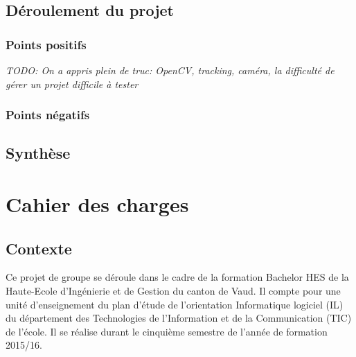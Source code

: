 \documentclass[11pt,a4paper,oldfontcommands]{memoir}
\begin{document}
\section{Déroulement du projet}

\subsection{Points positifs}

\textit{TODO: On a appris plein de truc: OpenCV, tracking, caméra, la difficulté de gérer un projet difficile à tester}

\subsection{Points négatifs}

\section{Synthèse}


\lstlistoflistings


\appendix


\chapter{Cahier des charges}

\section{Contexte}

Ce projet de groupe se déroule dans le cadre de la formation Bachelor HES de la Haute-Ecole d'Ingénierie et de Gestion du canton de Vaud. Il compte pour une unité d'enseignement du plan d'étude de l'orientation Informatique logiciel (IL) du département des Technologies de l'Information et de la Communication (TIC) de l'école. Il se réalise durant le cinquième semestre de l'année de formation 2015/16.
\end{document}
